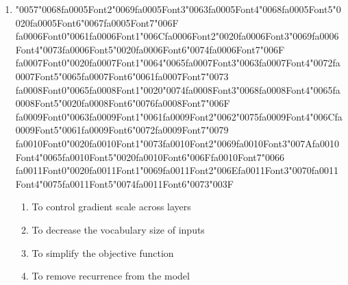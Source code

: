 \documentclass[12pt]{article}
\begin{document}
\begin{enumerate}[label=Q\arabic*.]
 \begin{enumerate}[label=(\Alph*)]
     \item The documents are strongly unrelated in topic
     \item They have negatively correlated term weights
     \item The similarity computation was implemented incorrectly
     \item The documents share no terms
 \end{enumerate}
 
 \item {\char"0057}{\char"0068}{\csname fa0005Font2\endcsname\char"0069}{\csname fa0005Font3\endcsname\char"0063}{\csname fa0005Font4\endcsname\char"0068}{\csname fa0005Font5\endcsname\char"0020}{\csname fa0005Font6\endcsname\char"0067}{\csname fa0005Font7\endcsname\char"006F} {\csname fa0006Font0\endcsname\char"0061}{\csname fa0006Font1\endcsname\char"006C}{\csname fa0006Font2\endcsname\char"0020}{\csname fa0006Font3\endcsname\char"0069}{\csname fa0006Font4\endcsname\char"0073}{\csname fa0006Font5\endcsname\char"0020}{\csname fa0006Font6\endcsname\char"0074}{\csname fa0006Font7\endcsname\char"006F} {\csname fa0007Font0\endcsname\char"0020}{\csname fa0007Font1\endcsname\char"0064}{\char"0065}{\csname fa0007Font3\endcsname\char"0063}{\csname fa0007Font4\endcsname\char"0072}{\csname fa0007Font5\endcsname\char"0065}{\csname fa0007Font6\endcsname\char"0061}{\csname fa0007Font7\endcsname\char"0073} {\csname fa0008Font0\endcsname\char"0065}{\csname fa0008Font1\endcsname\char"0020}{\char"0074}{\csname fa0008Font3\endcsname\char"0068}{\csname fa0008Font4\endcsname\char"0065}{\csname fa0008Font5\endcsname\char"0020}{\csname fa0008Font6\endcsname\char"0076}{\csname fa0008Font7\endcsname\char"006F} {\csname fa0009Font0\endcsname\char"0063}{\csname fa0009Font1\endcsname\char"0061}{\csname fa0009Font2\endcsname\char"0062}{\char"0075}{\csname fa0009Font4\endcsname\char"006C}{\csname fa0009Font5\endcsname\char"0061}{\csname fa0009Font6\endcsname\char"0072}{\csname fa0009Font7\endcsname\char"0079} {\csname fa0010Font0\endcsname\char"0020}{\csname fa0010Font1\endcsname\char"0073}{\csname fa0010Font2\endcsname\char"0069}{\csname fa0010Font3\endcsname\char"007A}{\csname fa0010Font4\endcsname\char"0065}{\csname fa0010Font5\endcsname\char"0020}{\csname fa0010Font6\endcsname\char"006F}{\csname fa0010Font7\endcsname\char"0066} {\csname fa0011Font0\endcsname\char"0020}{\csname fa0011Font1\endcsname\char"0069}{\csname fa0011Font2\endcsname\char"006E}{\csname fa0011Font3\endcsname\char"0070}{\csname fa0011Font4\endcsname\char"0075}{\csname fa0011Font5\endcsname\char"0074}{\csname fa0011Font6\endcsname\char"0073}{\char"003F}
 \begin{enumerate}[label=(\Alph*)]
     \item To control gradient scale across layers
     \item To decrease the vocabulary size of inputs
     \item To simplify the objective function
     \item To remove recurrence from the model
 \end{enumerate}
 

\end{enumerate}
\end{document}

